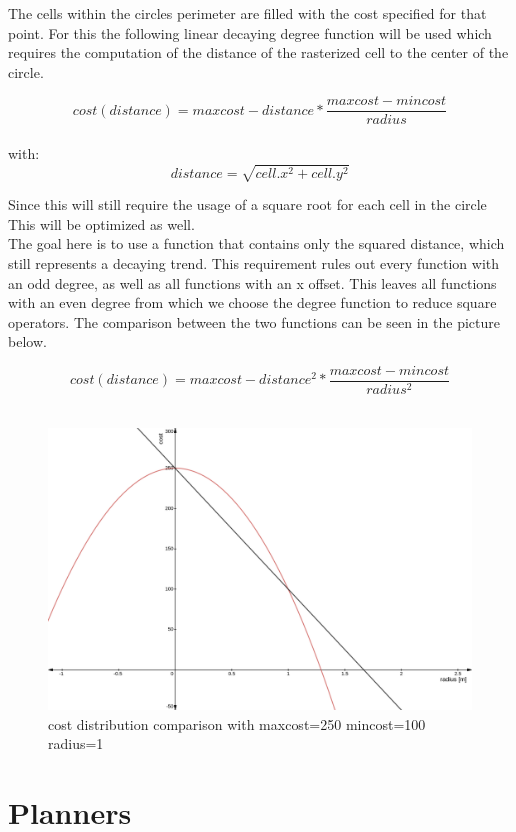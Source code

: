 The cells within the circles perimeter are filled with the cost specified for that point. For this the following linear decaying  degree function will be used which requires the computation of the distance of the rasterized cell to the center of the circle.

\[cost(distance)=maxcost-distance*\frac{maxcost-mincost}{radius}\]\\
with: \[distance=\sqrt{cell.x^2+cell.y^2}\]

 Since this will still require the usage of a square root for each cell in the circle This will be optimized as well.\\

The goal here is to use a function that contains only the squared distance, which still represents a decaying trend. This requirement rules out every function with an odd degree, as well as all functions with an x offset. This leaves all functions with an even degree from which we choose the  degree function to reduce square operators. The comparison between the two functions can be seen in the picture below.

\[cost(distance)=maxcost-distance^2*\frac{maxcost-mincost}{radius^2}\]\\

\begin{figure}[H]
	\begin{center}
	\includegraphics[width=140mm]{Pictures/linear cost comparison}
	\caption{cost distribution comparison with maxcost=250 mincost=100 radius=1}
	\end{center}
\end{figure}


\section{Planners}

